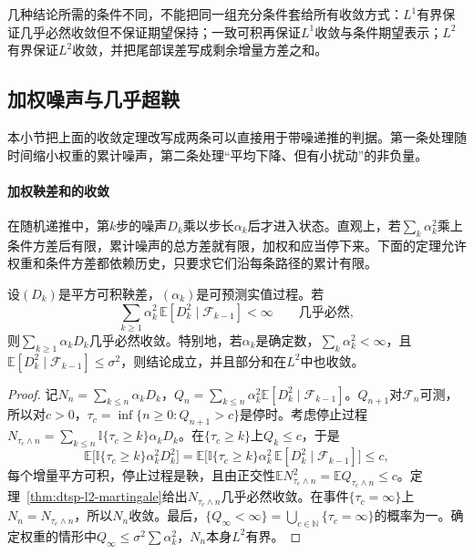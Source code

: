 几种结论所需的条件不同，不能把同一组充分条件套给所有收敛方式：$L^1$有界保证几乎必然收敛但不保证期望保持；一致可积再保证$L^1$收敛与条件期望表示；$L^2$有界保证$L^2$收敛，并把尾部误差写成剩余增量方差之和。

\subsection{加权噪声与几乎超鞅}
\label{sec:dtsp-weighted-noise}

本小节把上面的收敛定理改写成两条可以直接用于带噪递推的判据。第一条处理随时间缩小权重的累计噪声，第二条处理“平均下降、但有小扰动”的非负量。

\paragraph{加权鞅差和的收敛}
在随机递推中，第$k$步的噪声$D_k$乘以步长$\alpha_k$后才进入状态。直观上，若$\sum_k\alpha_k^2$乘上条件方差后有限，累计噪声的总方差就有限，加权和应当停下来。下面的定理允许权重和条件方差都依赖历史，只要求它们沿每条路径的累计有限。

\begin{theorem}[加权鞅差和的收敛]
  \label{thm:dtsp-weighted-martingale-sum}
  设$(D_k)$是平方可积鞅差，$(\alpha_k)$是可预测实值过程。若
  \[
    \sum_{k\geq1}\alpha_k^2\,\mathbb E[D_k^2\mid\mathcal F_{k-1}]<\infty\qquad\text{几乎必然},
  \]
  则$\sum_{k\geq1}\alpha_kD_k$几乎必然收敛。特别地，若$\alpha_k$是确定数，$\sum_k\alpha_k^2<\infty$，且$\mathbb E[D_k^2\mid\mathcal F_{k-1}]\leq\sigma^2$，则结论成立，并且部分和在$L^2$中也收敛。
\end{theorem}

\begin{proof}
记$N_n=\sum_{k\leq n}\alpha_kD_k$，$Q_n=\sum_{k\leq n}\alpha_k^2\mathbb E[D_k^2\mid\mathcal F_{k-1}]$。$Q_{n+1}$对$\mathcal F_n$可测，所以对$c>0$，$\tau_c=\inf\{n\geq0:Q_{n+1}>c\}$是停时。考虑停止过程$N_{\tau_c\wedge n}=\sum_{k\leq n}\mathbb I\{\tau_c\geq k\}\alpha_kD_k$。在$\{\tau_c\geq k\}$上$Q_k\leq c$，于是
\[
  \mathbb E\bigl[\mathbb I\{\tau_c\geq k\}\alpha_k^2D_k^2\bigr]=\mathbb E\bigl[\mathbb I\{\tau_c\geq k\}\alpha_k^2\,\mathbb E[D_k^2\mid\mathcal F_{k-1}]\bigr]\leq c,
\]
每个增量平方可积，停止过程是鞅，且由正交性$\mathbb EN_{\tau_c\wedge n}^2=\mathbb EQ_{\tau_c\wedge n}\leq c$。定理~\ref{thm:dtsp-l2-martingale}给出$N_{\tau_c\wedge n}$几乎必然收敛。在事件$\{\tau_c=\infty\}$上$N_n=N_{\tau_c\wedge n}$，所以$N_n$收敛。最后，$\{Q_\infty<\infty\}=\bigcup_{c\in\mathbb N}\{\tau_c=\infty\}$的概率为一。确定权重的情形中$Q_\infty\leq\sigma^2\sum\alpha_k^2$，$N_n$本身$L^2$有界。
\end{proof}

